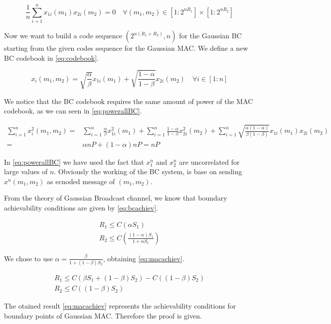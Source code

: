 \begin{equation}
	\frac{1}{n}\sum_{i=1}^n x_{1i}(m_1) x_{2i} (m_2)= 0 \quad \forall (m_1,m_2) \in [1:2^{nR_1}]\times[1:2^{nR_2}]
	\label{eq:uncor}
\end{equation}

Now we want to build a code sequence $(2^{n(R_1+R_2)},n)$ for the Gaussian BC starting from the given codes sequence for the Gaussian MAC. We define a new BC codebook in \eqref{eq:codebook}.

\begin{equation}
	x_i(m_1,m_2)= \sqrt{\frac{\alpha}{\beta}}x_{1i}(m_1)+\sqrt{\frac{1-\alpha}{1-\beta}}x_{2i}(m_2) \quad \forall i \in [1:n]
	\label{eq:codebook}
\end{equation}

We notice that the BC codebook requires the same amount of power of the MAC codebook, as we can seen in \eqref{eq:powerallBC}.

\begin{equation}
	\begin{aligned}
		\sum_{i=1}^n x_i^2(m_1,m_2) = & \sum_{i=1}^n \frac{\alpha}{\beta} x_{1i}^2(m_1) + \sum_{i=1}^n \frac{1-\alpha}{1-\beta} x_{2i}^2(m_2) + \sum_{i=1}^n \sqrt{\frac{\alpha(1-\alpha)}{\beta(1-\beta)}} x_{1i}(m_1) x_{2i}(m_2)\\
		= & \alpha nP + (1-\alpha) nP = nP
	\end{aligned}
	\label{eq:powerallBC}
\end{equation}

In \eqref{eq:powerallBC} we have used the fact that $x_1^n$ and $x_2^n$ are uncorrelated for large values of $n$. Obviously the working of the BC system, is base on sending $x^n(m_1,m_2)$  as ecnoded message of $(m_1,m_2)$.

From the theory of Gaussian Broadcast channel, we know that boundary achievability conditions are given by \eqref{eq:bcachiev}.

\begin{equation}
\begin{gathered}
	R_1 \leq C(\alpha S_1) \\
	R_2  \leq C \left( \frac{(1-\alpha )S_1} {1+\alpha S_1} \right)
\end{gathered}
\label{eq:bcachiev}
\end{equation}

We chose to use $\alpha = \frac{\beta}{1+ (1-\beta) S_2}$, obtaining \eqref{eq:macachiev}.

\begin{equation}
\begin{gathered}
	R_1 \leq C (\beta S_1 + (1-\beta)S_2) - C((1-\beta)S_2) \\
	R_2  \leq   C \left( (1-\beta)S_2 \right)
\end{gathered}
\label{eq:macachiev}
\end{equation}

The otained result \eqref{eq:macachiev} represents the achievability conditions for boundary points of Gaussian MAC. Therefore the proof is given.
